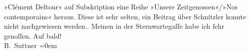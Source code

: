 \begin{ledgroupsized}[t]{13cm}
{{{                  »Clément Deltour« auf Subskription eine Reihe »Unsere Zeitgenossen«/»Nos
                  contemporains« heraus. Diese ist sehr selten, ein Beitrag über Schnitzler konnte nicht nachgewiesen werden.}}}\label{K_L02156_2h}.\pend
           \pstart
           Meinen \label{K_L02156_3v}\label{K_L02156_3h} in der Sternwartegaſſe habe ich ſehr
               genoſſen.\pend
           \pstart
           Auf bald!{\\[\baselineskip]}\spacefill\mbox{B. Suttner}\pend
           \leftskip=0em{}
         
         \endnumbering{}\end{ledgroupsized}  \newcommand{\dateiname}{L02156}\newcommand{\titel}{Bertha von Suttner an Arthur Schnitzler, 4. 11. 1913}\newcommand{\editorInnen}{Martin Anton Müller und Gerd-Hermann Susen}
      